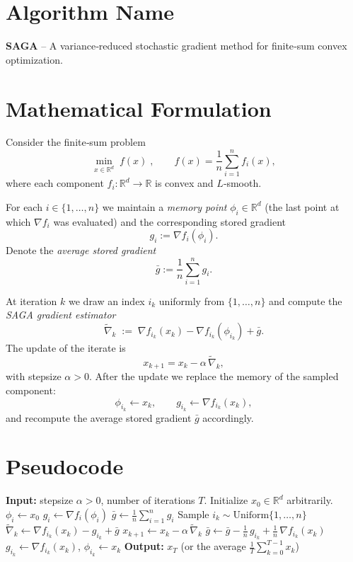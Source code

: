 \documentclass{article}
\newcommand{\R}{\mathbb{R}}
\begin{document}
\section*{Algorithm Name}
\textbf{SAGA} – A variance‑reduced stochastic gradient method for finite‑sum convex optimization.

\section*{Mathematical Formulation}
Consider the finite‑sum problem
\[
\min_{x\in\R^{d}} \; f(x)\;,\qquad 
f(x)=\frac1n\sum_{i=1}^{n} f_i(x),
\]
where each component $f_i:\R^{d}\!\to\!\R$ is convex and $L$‑smooth.  

For each $i\in\{1,\dots,n\}$ we maintain a \emph{memory point} $\phi_i\in\R^{d}$ (the last point at which $\nabla f_i$ was evaluated) and the corresponding stored gradient 
\[
g_i:=\nabla f_i(\phi_i).
\]
Denote the \emph{average stored gradient}
\[
\bar g:=\frac1n\sum_{i=1}^{n} g_i .
\]

At iteration $k$ we draw an index $i_k$ uniformly from $\{1,\dots,n\}$ and compute the \emph{SAGA gradient estimator}
\[
\widetilde \nabla_k \;:=\; \nabla f_{i_k}(x_k)-\nabla f_{i_k}(\phi_{i_k})+\bar g .
\tag{1}
\]
The update of the iterate is
\[
x_{k+1}=x_k-\alpha\,\widetilde \nabla_k,
\tag{2}
\]
with stepsize $\alpha>0$.  
After the update we replace the memory of the sampled component:
\[
\phi_{i_k}\leftarrow x_k,\qquad 
g_{i_k}\leftarrow \nabla f_{i_k}(x_k),
\tag{3}
\]
and recompute the average stored gradient $\bar g$ accordingly.

\section*{Pseudocode}
\begin{algorithm}[H]
\caption{SAGA}
\begin{algorithmic}[1]
\State \textbf{Input:} stepsize $\alpha>0$, number of iterations $T$.
\State Initialize $x_0\in\R^{d}$ arbitrarily.
    \State $\phi_i\gets x_0$ 
    \State $g_i\gets \nabla f_i(\phi_i)$
\EndFor
\State $\bar g \gets \frac1n\sum_{i=1}^{n} g_i$
    \State Sample $i_k\sim\text{Uniform}\{1,\dots,n\}$
    \State $\widetilde \nabla_k \gets \nabla f_{i_k}(x_k)-g_{i_k}+\bar g$
    \State $x_{k+1}\gets x_k-\alpha\,\widetilde \nabla_k$
    \State $\bar g \gets \bar g -\frac{1}{n}\,g_{i_k}+ \frac{1}{n}\,\nabla f_{i_k}(x_k)$
    \State $g_{i_k}\gets \nabla f_{i_k}(x_k)$,\; $\phi_{i_k}\gets x_k$
\EndFor
\State \textbf{Output:} $x_T$ (or the average $\frac1T\sum_{k=0}^{T-1}x_k$)
\end{algorithmic}
\end{algorithm}
\end{document}
